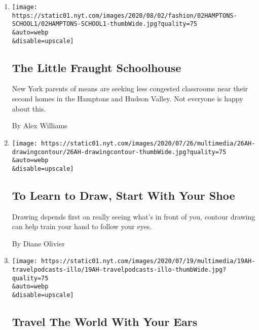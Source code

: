 \begin{enumerate}
\def\labelenumi{\arabic{enumi}.}
\item
  \href{/2020/08/01/style/wealthy-rich-parents-coronavirus-schools-hamptons.html}{}

  \texttt{[image: https://static01.nyt.com/images/2020/08/02/fashion/02HAMPTONS-SCHOOL1/02HAMPTONS-SCHOOL1-thumbWide.jpg?quality=75\\\&auto=webp\\\&disable=upscale]}

  \hypertarget{the-little-fraught-schoolhouse}{%
  \subsection{The Little Fraught
  Schoolhouse}\label{the-little-fraught-schoolhouse}}

  New York parents of means are seeking less congested classrooms near
  their second homes in the Hamptons and Hudson Valley. Not everyone is
  happy about this.

  By Alex Williams
\item
  \href{/2020/07/25/at-home/coronavirus-learn-to-draw.html}{}

  \texttt{[image: https://static01.nyt.com/images/2020/07/26/multimedia/26AH-drawingcontour/26AH-drawingcontour-thumbWide.jpg?quality=75\\\&auto=webp\\\&disable=upscale]}

  \hypertarget{to-learn-to-draw-start-with-your-shoe}{%
  \subsection{To Learn to Draw, Start With Your
  Shoe}\label{to-learn-to-draw-start-with-your-shoe}}

  Drawing depends first on really seeing what's in front of you, contour
  drawing can help train your hand to follow your eyes.

  By Diane Olivier
\item
  \href{/2020/07/18/at-home/coronavirus-travel-podcasts.html}{}

  \texttt{[image: https://static01.nyt.com/images/2020/07/19/multimedia/19AH-travelpodcasts-illo/19AH-travelpodcasts-illo-thumbWide.jpg?quality=75\\\&auto=webp\\\&disable=upscale]}

  \hypertarget{travel-the-world-with-your-ears}{%
  \subsection{Travel The World With Your
  Ears}\label{travel-the-world-with-your-ears}}


\end{enumerate}
